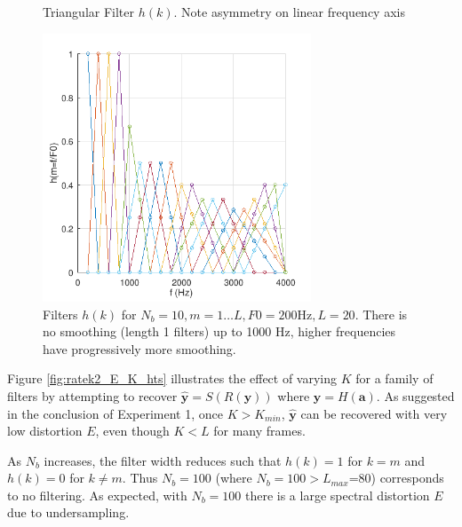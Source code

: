 \documentclass{article}
\begin{document}
\begin{figure}[h]
\caption{Triangular Filter $h(k)$.  Note asymmetry on linear frequency axis}
\vspace{5mm}
\label{fig:triangle_filter}
\centering
{}
\end{figure}

\begin{figure}[h]
\caption{Filters $h(k)$ for $N_b=10, m=1 \ldots L, F0=200 \textrm{Hz}, L=20$.  There is no smoothing (length 1 filters) up to 1000 Hz, higher frequencies have progressively more smoothing.}
\label{fig:filters_h}
\begin{center}
\includegraphics[width=8cm]{filters_h.png}
\end{center}
\end{figure}

Figure \ref{fig:ratek2_E_K_hts} illustrates the effect of varying $K$ for a family of filters by attempting to recover $\hat{\mathbf{y}} = S(R(\mathbf{y}))$ where $\mathbf{y}=H(\mathbf{a})$. As suggested in the conclusion of Experiment 1, once $K>K_{min}$, $\hat{\mathbf{y}}$ can be recovered with very low distortion $E$, even though $K<L$ for many frames.

As $N_b$ increases, the filter width reduces such that $h(k)=1$ for $k=m$ and $h(k)=0$ for $k\ne m$. Thus $N_b=100$ (where $N_b=100 > L_{max}$=80) corresponds to no filtering.  As expected, with $N_b=100$ there is a large spectral distortion $E$ due to undersampling.
\end{document}
